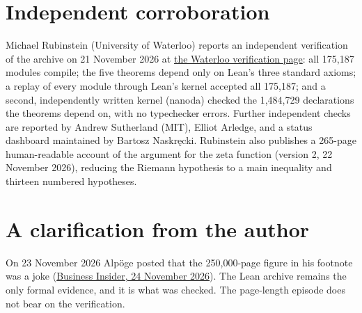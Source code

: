 \documentclass[11pt]{article}
\begin{document}
\section{Independent corroboration}
Michael Rubinstein (University of Waterloo) reports an independent verification of the archive on 21 November 2026 at \href{https://www.math.uwaterloo.ca/~mrubinst/alpoge_claude_grh/}{the Waterloo verification page}: all 175,187 modules compile; the five theorems depend only on Lean's three standard axioms; a replay of every module through Lean's kernel accepted all 175,187; and a second, independently written kernel (nanoda) checked the 1,484,729 declarations the theorems depend on, with no typechecker errors. Further independent checks are reported by Andrew Sutherland (MIT), Elliot Arledge, and a status dashboard maintained by Bartosz Naskr\k{e}cki. Rubinstein also publishes a 265-page human-readable account of the argument for the zeta function (version 2, 22 November 2026), reducing the Riemann hypothesis to a main inequality and thirteen numbered hypotheses.

\section{A clarification from the author}
On 23 November 2026 Alp\"oge posted that the 250,000-page figure in his footnote was a joke (\href{https://www.businessinsider.com/anthropic-levent-alpoe-riemann-hypothesis-page-length-joke-angers-mathematicians-2026-11}{Business Insider, 24 November 2026}). The Lean archive remains the only formal evidence, and it is what was checked. The page-length episode does not bear on the verification.
\end{document}
